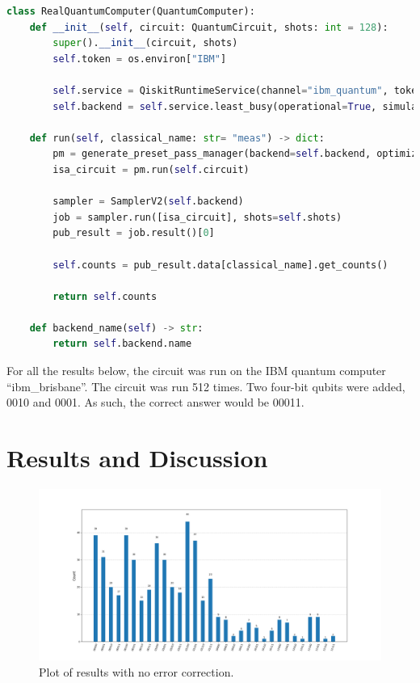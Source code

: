 \documentclass[letterpaper]{article}
\begin{document}
\begin{lstlisting}[language=Python]
class RealQuantumComputer(QuantumComputer):
    def __init__(self, circuit: QuantumCircuit, shots: int = 128):
        super().__init__(circuit, shots)
        self.token = os.environ["IBM"]

        self.service = QiskitRuntimeService(channel="ibm_quantum", token=self.token)
        self.backend = self.service.least_busy(operational=True, simulator=False)

    def run(self, classical_name: str= "meas") -> dict:
        pm = generate_preset_pass_manager(backend=self.backend, optimization_level=1)
        isa_circuit = pm.run(self.circuit)

        sampler = SamplerV2(self.backend)
        job = sampler.run([isa_circuit], shots=self.shots)
        pub_result = job.result()[0]

        self.counts = pub_result.data[classical_name].get_counts()

        return self.counts

    def backend_name(self) -> str:
        return self.backend.name
\end{lstlisting}

For all the results below, the circuit was run on the IBM quantum computer ``ibm\_brisbane''. The circuit was run 512 times. Two four-bit qubits were added, 0010 and 0001. As such, the correct answer would be 00011.

\section{Results and Discussion}

\begin{figure}[H]
    \centering
    \includegraphics[width=\textwidth]{adder_plot}
    \caption{Plot of results with no error correction.}
    \label{fig:adder-plot}
\end{figure}
\end{document}
